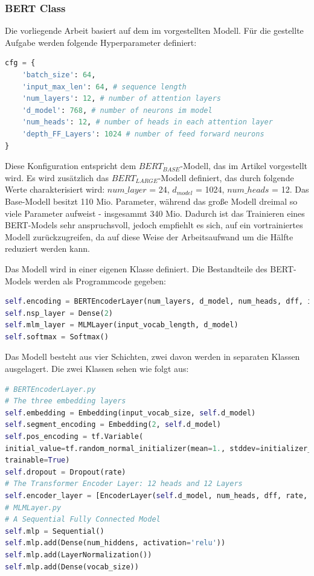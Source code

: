 \subsubsection{BERT Class}\label{bert_class}
Die vorliegende Arbeit basiert auf dem im \cite{BERT:19} vorgestellten Modell. Für die gestellte Aufgabe werden folgende Hyperparameter definiert:

\begin{lstlisting}[language=Python,caption={Die Hyperparametern vom BERT}, label={lis:BERT_Base}] 	
cfg = {
	'batch_size': 64,
	'input_max_len': 64, # sequence length
	'num_layers': 12, # number of attention layers
	'd_model': 768,	# number of neurons im model
	'num_heads': 12, # number of heads in each attention layer
	'depth_FF_Layers': 1024 # number of feed forward neurons
}
\end{lstlisting}

Diese Konfiguration entspricht dem $BERT_{BASE}$-Modell, das im Artikel \cite{BERT:19} vorgestellt wird. Es wird zusätzlich das $BERT_{LARGE}$-Modell definiert, das durch folgende Werte charakterisiert wird: $num\_layer$ = 24,  $d_{model}$ = 1024, $num\_heads$ = 12. Das Base-Modell besitzt 110 Mio. Parameter, während das große Modell dreimal so viele Parameter aufweist - insgesammt 340 Mio. Dadurch ist das Trainieren eines BERT-Models sehr anspruchsvoll, jedoch empfiehlt es sich, auf ein vortrainiertes Modell zurückzugreifen, da auf diese Weise der Arbeitsaufwand um die Hälfte reduziert werden kann.

Das Modell wird in einer eigenen Klasse definiert. Die Bestandteile des BERT-Models werden als Programmcode gegeben:

\begin{lstlisting}[language=Python, caption={BERT-Struktur bei Pre-Training}]
self.encoding = BERTEncoderLayer(num_layers, d_model, num_heads, dff, input_vocab_length, maximum_positional_encoding, rate=rate, layer_norm_eps=layer_norm_eps)
self.nsp_layer = Dense(2)
self.mlm_layer = MLMLayer(input_vocab_length, d_model)
self.softmax = Softmax()
\end{lstlisting}

Das Modell besteht aus vier Schichten, zwei davon werden in separaten Klassen ausgelagert. Die zwei Klassen sehen wie folgt aus:

\begin{lstlisting}[language=Python, caption={Definition des BERT-Encoder-Layers}]
# BERTEncoderLayer.py
# The three embedding layers
self.embedding = Embedding(input_vocab_size, self.d_model)
self.segment_encoding = Embedding(2, self.d_model)
self.pos_encoding = tf.Variable(
initial_value=tf.random_normal_initializer(mean=1., stddev=initializer_range)(shape=[1, maximum_position_encoding, d_model]),
trainable=True)
self.dropout = Dropout(rate)
# The Transformer Encoder Layer: 12 heads and 12 Layers
self.encoder_layer = [EncoderLayer(self.d_model, num_heads, dff, rate, layer_norm_eps) for _ in range(self.num_layers)]
# MLMLayer.py
# A Sequential Fully Connected Model
self.mlp = Sequential()
self.mlp.add(Dense(num_hiddens, activation='relu'))
self.mlp.add(LayerNormalization())
self.mlp.add(Dense(vocab_size))
\end{lstlisting}

